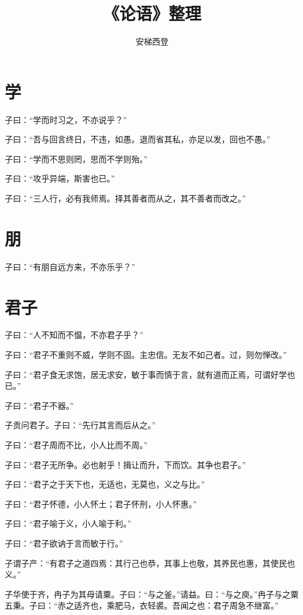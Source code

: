 \documentclass[a5paper]{ctexbook}
\title{《论语》整理}
\author{安梯西登}
\date{}
\begin{document}
    \maketitle

    \tableofcontents

    \chapter{学}

    子曰：“学而时习之，不亦说乎？”

    子曰：“吾与回言终日，不违，如愚。退而省其私，亦足以发，回也不愚。”

    子曰：“学而不思则罔，思而不学则殆。”

    子曰：“攻乎异端，斯害也已。”

    子曰：“三人行，必有我师焉。择其善者而从之，其不善者而改之。”

    \chapter{朋}
    
    子曰：“有朋自远方来，不亦乐乎？”

    \chapter{君子}
    
    子曰：“人不知而不愠，不亦君子乎？”

    子曰：“君子不重则不威，学则不固。主忠信。无友不如己者。过，则勿惮改。”

    子曰：“君子食无求饱，居无求安，敏于事而慎于言，就有道而正焉，可谓好学也已。”

    子曰：“君子不器。”
    
    子贡问君子。子曰：“先行其言而后从之。”
    
    子曰：“君子周而不比，小人比而不周。”

    子曰：“君子无所争。必也射乎！揖让而升，下而饮。其争也君子。”

    子曰：“君子之于天下也，无适也，无莫也，义之与比。”

    子曰：“君子怀德，小人怀土；君子怀刑，小人怀惠。”

    子曰：“君子喻于义，小人喻于利。”

    子曰：“君子欲讷于言而敏于行。”

    子谓子产：“有君子之道四焉：其行己也恭，其事上也敬，其养民也惠，其使民也义。”

    子华使于齐，冉子为其母请粟。子曰：“与之釜。”请益。曰：“与之庾。”冉子与之粟五秉。子曰：“赤之适齐也，乘肥马，衣轻裘。吾闻之也：君子周急不继富。”
\end{document}
